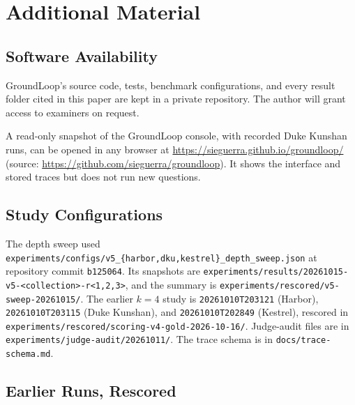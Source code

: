 \documentclass[12pt, a4paper, oneside]{report}
\newcommand{\instructions}[1]{}
\begin{document}

\appendix

\chapter{Additional Material}
\label{appendix-a}


\instructions{If you have an Overleaf account (either free or paid) you can use this file to start a new Overleaf project.

If you do not want an Overleaf account you can install TeX on your computer and use the template files provided by the Office of Signature Work.}

\section{Software Availability}
\label{sec:availability}

{\raggedright
GroundLoop's source code, tests, benchmark configurations, and every
result folder cited in this paper are kept in a private repository. The
author will grant access to examiners on request.

A read-only snapshot of the GroundLoop console, with recorded Duke Kunshan
runs, can be opened in any browser at
\url{https://sieguerra.github.io/groundloop/} (source:
\url{https://github.com/sieguerra/groundloop}). It shows the interface and
stored traces but does not run new questions.\par}

\section{Study Configurations}

{\raggedright
The depth sweep used \texttt{experiments/configs/v5\_\{harbor,dku,kestrel\}\_depth\_sweep.json}
at repository commit \texttt{b125064}. Its snapshots are
\texttt{experiments/results/20261015-v5-<collection>-r<1,2,3>}, and the
summary is \texttt{experiments/rescored/v5-sweep-20261015/}. The earlier
$k=4$ study is \texttt{20261010T203121} (Harbor), \texttt{20261010T203115}
(Duke Kunshan), and \texttt{20261010T202849} (Kestrel), rescored in
\texttt{experiments/rescored/scoring-v4-gold-2026-10-16/}. Judge-audit files
are in \texttt{experiments/judge-audit/20261011/}. The trace schema is in
\texttt{docs/trace-schema.md}.\par}

\section{Earlier Runs, Rescored}
\end{document}
